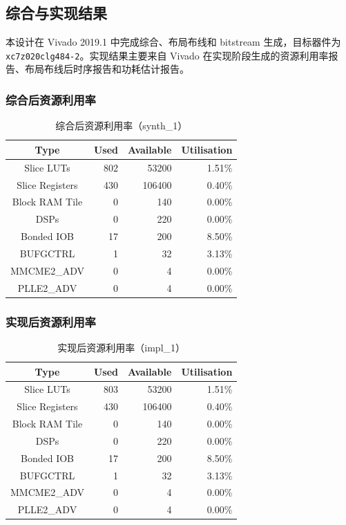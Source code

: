 \subsection{综合与实现结果}

本设计在 Vivado 2019.1 中完成综合、布局布线和 bitstream 生成，目标器件为 \texttt{xc7z020clg484-2}。实现结果主要来自 Vivado 在实现阶段生成的资源利用率报告、布局布线后时序报告和功耗估计报告。

\subsubsection{综合后资源利用率}

\begin{table}[H]
  \centering
  \caption{综合后资源利用率（synth\_1）}
  \label{tab:synth-utilization}
  \begin{tabular}{c|r|r|r}
    \hline
    Type & Used & Available & Utilisation \\
    \hline
    Slice LUTs & 802 & 53200 & 1.51\% \\
    Slice Registers & 430 & 106400 & 0.40\% \\
    Block RAM Tile & 0 & 140 & 0.00\% \\
    DSPs & 0 & 220 & 0.00\% \\
    Bonded IOB & 17 & 200 & 8.50\% \\
    BUFGCTRL & 1 & 32 & 3.13\% \\
    MMCME2\_ADV & 0 & 4 & 0.00\% \\
    PLLE2\_ADV & 0 & 4 & 0.00\% \\
    \hline
  \end{tabular}
\end{table}

\subsubsection{实现后资源利用率}

\begin{table}[H]
  \centering
  \caption{实现后资源利用率（impl\_1）}
  \label{tab:implementation-utilization}
  \begin{tabular}{c|r|r|r}
    \hline
    Type & Used & Available & Utilisation \\
    \hline
    Slice LUTs & 803 & 53200 & 1.51\% \\
    Slice Registers & 430 & 106400 & 0.40\% \\
    Block RAM Tile & 0 & 140 & 0.00\% \\
    DSPs & 0 & 220 & 0.00\% \\
    Bonded IOB & 17 & 200 & 8.50\% \\
    BUFGCTRL & 1 & 32 & 3.13\% \\
    MMCME2\_ADV & 0 & 4 & 0.00\% \\
    PLLE2\_ADV & 0 & 4 & 0.00\% \\
    \hline
  \end{tabular}
\end{table}

